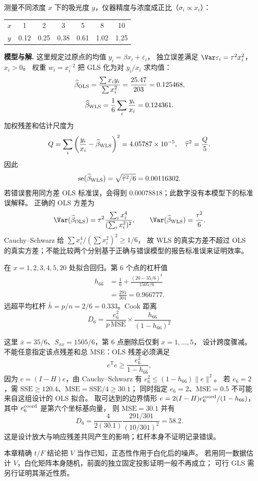 \begin{exbox}
测量不同浓度 $x$ 下的吸光度 $y$，仪器精度与浓度成正比（$\sigma_i\propto x_i$）：

\begin{center}
\begin{tabular}{lcccccc}
\hline
$x$ & 1 & 2 & 3 & 5 & 8 & 10 \\
$y$ & 0.12 & 0.25 & 0.38 & 0.61 & 1.02 & 1.25 \\
\hline
\end{tabular}
\end{center}


\textbf{模型与解.} 这里规定过原点的均值 $y_i=\beta x_i+\varepsilon_i$，
独立误差满足 $\Var\varepsilon_i=\tau^2x_i^2$，$x_i>0$。
权重 $w_i=x_i^{-2}$ 把 GLS 化为对 $y_i/x_i$ 求均值：
\[
 \widehat\beta_{\rm OLS}=\frac{\sum x_iy_i}{\sum x_i^2}
 =\frac{25.47}{203}=0.125468,
\]
\[
 \widehat\beta_{\rm WLS}=\frac16\sum_i\frac{y_i}{x_i}=0.124361.
\]
加权残差和估计尺度为
\[
 Q=\sum_i\left(\frac{y_i}{x_i}-\widehat\beta_{\rm WLS}\right)^2
 =4.05787\times10^{-5},\quad
 \widehat\tau^2=\frac Q5.
\]
因此
\[
 \operatorname{se}(\widehat\beta_{\rm WLS})
 =\sqrt{\widehat\tau^2/6}=0.00116302.
\]
若错误套用同方差 OLS 标准误，会得到 $0.00078818$；此数字没有本模型下的标准误解释。
正确的 OLS 方差为
\[
 \Var(\widehat\beta_{\rm OLS})
 =\tau^2\frac{\sum_i x_i^4}{(\sum_i x_i^2)^2},\qquad
 \Var(\widehat\beta_{\rm WLS})=\frac{\tau^2}{6}.
\]
Cauchy--Schwarz 给 $\sum x_i^4/(\sum x_i^2)^2\ge1/6$，
故 WLS 的真实方差不超过 OLS 的真实方差；不能比较两个分别基于正确与错误模型的报告标准误来证明效率。
\end{exbox}
\begin{exbox}[高杠杆点的识别]
在 $x=1,2,3,4,5,20$ 处拟合回归。第 6 个点的杠杆值
\[
\begin{aligned}
 h_{66}&=\frac16+\frac{(20-35/6)^2}{1505/6}\\
 &=\frac{291}{301}=0.966777.
\end{aligned}
\]
远超平均杠杆 $\bar h=p/n=2/6=0.333$。Cook 距离
\[
D_6=\frac{e_6^2}{p\,\mathrm{MSE}}\times\frac{h_{66}}{(1-h_{66})^2}
\]

这里 $\bar x=35/6$、$S_{xx}=1505/6$，第 6 点删除后仅剩 $x=1,\ldots,5$，
设计跨度骤减。不能任意指定该点残差和总 MSE：OLS 残差必须满足
\[
 e^{\mathsf T}e\ge\frac{e_6^2}{1-h_{66}},
\]
因为 $e=(I-H)e$，由 Cauchy--Schwarz 有 $e_6^2\le(1-h_{66})\|e\|^2$。
若 $e_6=2$，需 $\mathrm{SSE}\ge120.4$、$\mathrm{MSE}=\mathrm{SSE}/4\ge30.1$；
同时指定 $e_6=2$、$\mathrm{MSE}=0.5$ 不可能来自这组设计的 OLS 拟合。
取可达到的边界情形 $e=2(I-H)e_6^{\rm coord}/(1-h_{66})$，其中 $e_6^{\rm coord}$ 是第六个坐标基向量，
则 $\mathrm{MSE}=30.1$ 并有
\[
 D_6=\frac{4}{2(30.1)}\frac{291/301}{(10/301)^2}=58.2.
\]
这是设计放大与响应残差共同产生的影响；杠杆本身不证明记录错误。

\end{exbox}

\begin{note}[已知与估计的协方差形状]
本章精确 $t/F$ 结论把 $V$ 当作已知，正态性作用于白化后的噪声。
若用同一数据估计 $V$，白化矩阵本身随机，前面的独立固定投影证明一般不再成立；
可行 GLS 需另行证明其渐近性质。
\end{note}




